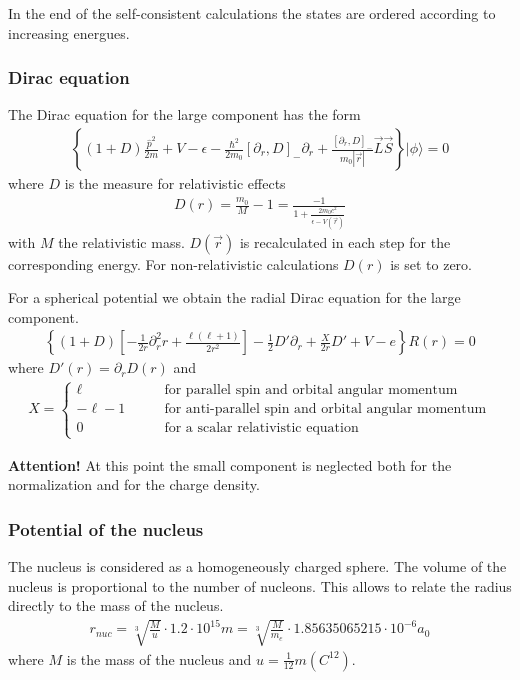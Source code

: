 \documentclass[11pt,a4paper]{report}
\begin{document}
In the end of the self-consistent calculations the states are ordered
according to increasing energues.

\subsubsection{Dirac equation}
The Dirac equation for the large component has the form
\begin{eqnarray*}
\left\lbrace
(1+D)\frac{\hat{p}^2}{2m}+V-\epsilon
-\frac{\hbar^2}{2m_0}[\partial_r,D]_-\partial_r
+\frac{[\partial_r,D]_-}{m_0|\vec{r}|}\vec{L}\vec{S}
\right\rbrace|\phi\rangle=0
\end{eqnarray*}
where $D$ is the measure for relativistic effects
\begin{eqnarray*}
D(r)=\frac{m_0}{M}-1=\frac{-1}{1+\frac{2m_0c^2}{\epsilon-V(\vec{r})}}
\end{eqnarray*}
with $M$ the relativistic mass. $D(\vec{r})$ is recalculated in each
step for the corresponding energy. For non-relativistic calculations
$D(r)$ is set to zero.

For a spherical potential we obtain the radial Dirac equation for the
large component.
\begin{eqnarray*}
\left\lbrace
(1+D)\left[-\frac{1}{2r}\partial_r^2 r+\frac{\ell(\ell+1)}{2r^2}\right]
-\frac{1}{2}D'\partial_r+\frac{X}{2r}D'+V-e\right\rbrace R(r)=0
\end{eqnarray*}
where $D'(r)=\partial_rD(r)$ and
\begin{eqnarray}
X=\left\lbrace\begin{array}{ll}
\ell &\qquad\textrm{for parallel spin and orbital angular momentum}\\
-\ell-1 &\qquad\textrm{for anti-parallel spin and orbital angular momentum}\\
0&\qquad\textrm{for a scalar relativistic equation}
	      \end{array}\right.
\end{eqnarray}

\textbf{Attention!} At this point the small component is neglected
both for the normalization and for the charge density.

\subsubsection{Potential of the nucleus}
The nucleus is considered as a homogeneously charged sphere. The
volume of the nucleus is proportional to the number of nucleons.  This
allows to relate the radius directly to the mass of the nucleus.\cite{cooper53_pr92_801,hofstadter56_rmp28_214}
\begin{eqnarray*}
r_{nuc}=\sqrt[3]{\frac{M}{u}}\cdot1.2\cdot 10^{15} m 
=\sqrt[3]{\frac{M}{m_e}}\cdot1.85635065215\cdot 10^{-6}  a_0
\end{eqnarray*}
where $M$ is the mass of the nucleus and
$u=\frac{1}{12}m(C^{12})$. 
\end{document}
